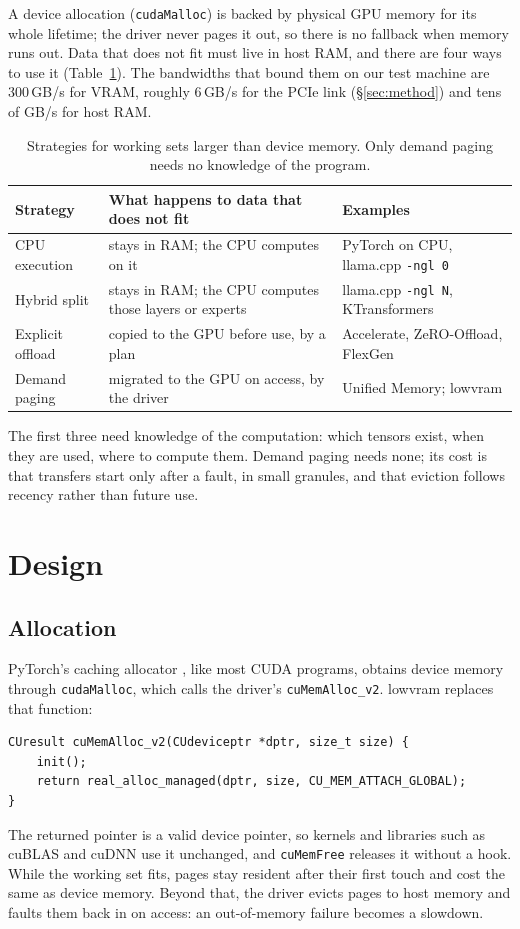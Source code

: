 \documentclass[11pt]{article}
\newcommand{\toprule}{\hline}\newcommand{\midrule}{\hline}\newcommand{\bottomrule}{\hline}%
\begin{document}
A device allocation (\texttt{cudaMalloc}) is backed by physical GPU memory for its whole
lifetime; the driver never pages it out, so there is no fallback when memory runs out. Data that
does not fit must live in host RAM, and there are four ways to use it (Table~\ref{tab:strategies}).
The bandwidths that bound them on our test machine are 300\,GB/s for VRAM, roughly 6\,GB/s for
the PCIe link (\S\ref{sec:method}) and tens of GB/s for host RAM.

\begin{table}[h]
\centering\small
\begin{tabular}{p{3.3cm}p{5.2cm}p{5.2cm}}
\toprule
Strategy & What happens to data that does not fit & Examples \\
\midrule
CPU execution & stays in RAM; the CPU computes on it & PyTorch on CPU, llama.cpp \texttt{-ngl 0} \\
Hybrid split & stays in RAM; the CPU computes those layers or experts & llama.cpp \texttt{-ngl N}, KTransformers \\
Explicit offload & copied to the GPU before use, by a plan & Accelerate, ZeRO-Offload, FlexGen \\
Demand paging & migrated to the GPU on access, by the driver & Unified Memory; lowvram \\
\bottomrule
\end{tabular}
\caption{Strategies for working sets larger than device memory. Only demand paging needs no
knowledge of the program.}
\label{tab:strategies}
\end{table}

The first three need knowledge of the computation: which tensors exist, when they are used,
where to compute them. Demand paging needs none; its cost is that transfers start only after a
fault, in small granules, and that eviction follows recency rather than future use.

\section{Design}
\label{sec:design}

\subsection{Allocation}
PyTorch's caching allocator \cite{pytorch}, like most CUDA programs, obtains device memory through
\texttt{cudaMalloc}, which calls the driver's \texttt{cuMemAlloc\_v2}. lowvram replaces that
function:
{\small
\begin{verbatim}
CUresult cuMemAlloc_v2(CUdeviceptr *dptr, size_t size) {
    init();
    return real_alloc_managed(dptr, size, CU_MEM_ATTACH_GLOBAL);
}
\end{verbatim}
}
The returned pointer is a valid device pointer, so kernels and libraries such as cuBLAS and cuDNN
use it unchanged, and \texttt{cuMemFree} releases it without a hook. While the working set fits,
pages stay resident after their first touch and cost the same as device memory. Beyond that, the
driver evicts pages to host memory and faults them back in on access: an out-of-memory failure
becomes a slowdown.
\end{document}
